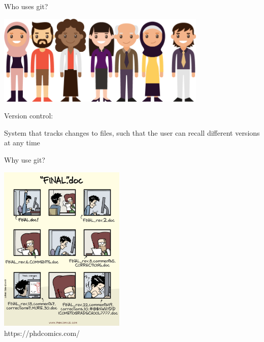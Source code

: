 \documentclass[12pt]{beamer}
\begin{document}
\begin{frame}

	\begin{flushright}
		\Large \textcolor{boss2}{Who uses git?} 
	\end{flushright}
	
	\begin{center}
	  \includegraphics[width=0.75\textwidth]{figs/everyone.png}
	\end{center}

\end{frame}





\begin{frame}

	\Large \textcolor{boss3}{Version control:} \\

	\bigskip
	\bigskip

	\textcolor{boss4}{System that tracks changes to files, such that the user can recall different versions at any time}


\end{frame}






\begin{frame}

	\begin{flushright}
		\Large \textcolor{boss2}{Why use git?} 
	\end{flushright}

	\begin{center}
	  \includegraphics[width=0.45\textwidth]{figs/phd101212s.pdf} \\
		https://phdcomics.com/
	\end{center}

\end{frame}
\end{document}
